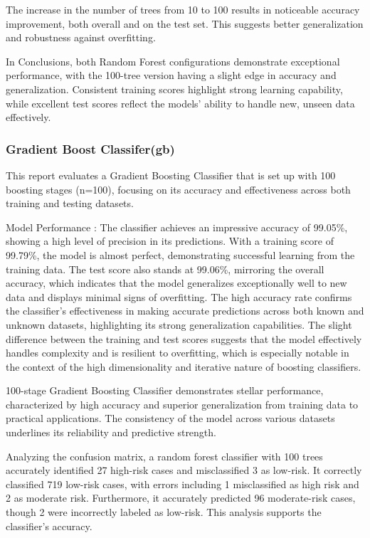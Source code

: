 \documentclass[a4paper]{article}
\begin{document}
 The increase in the number of trees from 10 to 100 results in noticeable accuracy improvement, both overall and on the test set. This suggests better generalization and robustness against overfitting.

 In Conclusions, both Random Forest configurations demonstrate exceptional performance, with the 100-tree version having a slight edge in accuracy and generalization. Consistent training scores highlight strong learning capability, while excellent test scores reflect the models' ability to handle new, unseen data effectively.

\subsubsection{Gradient Boost Classifer(gb)}
This report evaluates a Gradient Boosting Classifier that is set up with 100 boosting stages (n=100), focusing on its accuracy and effectiveness across both training and testing datasets.

 Model Performance : 
The classifier achieves an impressive accuracy of 99.05\%, showing a high level of precision in its predictions. With a training score of 99.79\%, the model is almost perfect, demonstrating successful learning from the training data. The test score also stands at 99.06\%, mirroring the overall accuracy, which indicates that the model generalizes exceptionally well to new data and displays minimal signs of overfitting. The high accuracy rate confirms the classifier's effectiveness in making accurate predictions across both known and unknown datasets, highlighting its strong generalization capabilities. The slight difference between the training and test scores suggests that the model effectively handles complexity and is resilient to overfitting, which is especially notable in the context of the high dimensionality and iterative nature of boosting classifiers.

100-stage Gradient Boosting Classifier demonstrates stellar performance, characterized by high accuracy and superior generalization from training data to practical applications. The consistency of the model across various datasets underlines its reliability and predictive strength.

Analyzing the confusion matrix, a random forest classifier with 100 trees accurately identified 27 high-risk cases and misclassified 3 as low-risk. It correctly classified 719 low-risk cases, with errors including 1 misclassified as high risk and 2 as moderate risk. Furthermore, it accurately predicted 96 moderate-risk cases, though 2 were incorrectly labeled as low-risk. This analysis supports the classifier's accuracy.
\end{document}
